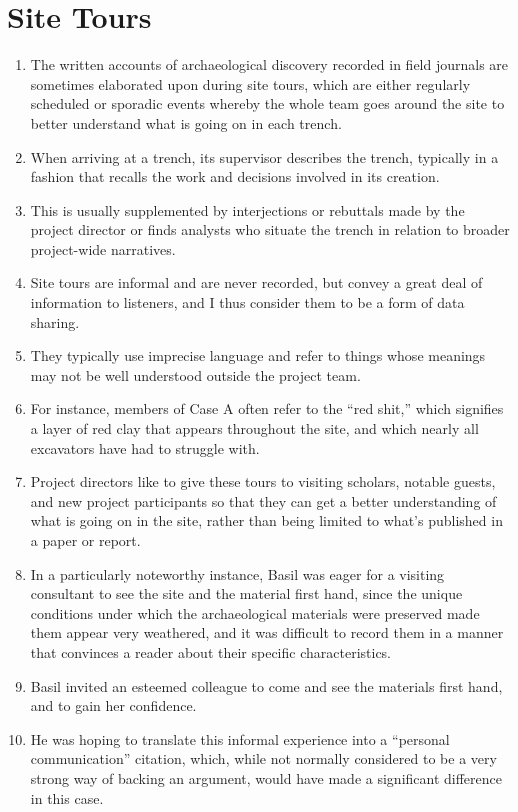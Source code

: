 \documentclass[12pt]{article}
\begin{document}
\section{Site Tours}
\begin{enumerate}
  \item The written accounts of archaeological discovery recorded in field journals are sometimes elaborated upon during site tours, which are either regularly scheduled or sporadic events whereby the whole team goes around the site to better understand what is going on in each trench.
  \item When arriving at a trench, its supervisor describes the trench, typically in a fashion that recalls the work and decisions involved in its creation.
  \item This is usually supplemented by interjections or rebuttals made by the project director or finds analysts who situate the trench in relation to broader project-wide narratives.
  \item Site tours are informal and are never recorded, but convey a great deal of information to listeners, and I thus consider them to be a form of data sharing.
  \item They typically use imprecise language and refer to things whose meanings may not be well understood outside the project team.
  \item For instance, members of Case A often refer to the ``red shit,'' which signifies a layer of red clay that appears throughout the site, and which nearly all excavators have had to struggle with.
  \item Project directors like to give these tours to visiting scholars, notable guests, and new project participants so that they can get a better understanding of what is going on in the site, rather than being limited to what's published in a paper or report.
  \item In a particularly noteworthy instance, Basil was eager for a visiting consultant to see the site and the material first hand, since the unique conditions under which the archaeological materials were preserved made them appear very weathered, and it was difficult to record them in a manner that convinces a reader about their specific characteristics.
  \item Basil invited an esteemed colleague to come and see the materials first hand, and to gain her confidence.
  \item He was hoping to translate this informal experience into a ``personal communication'' citation, which, while not normally considered to be a very strong way of backing an argument, would have made a significant difference in this case.

\end{enumerate}
\end{document}
